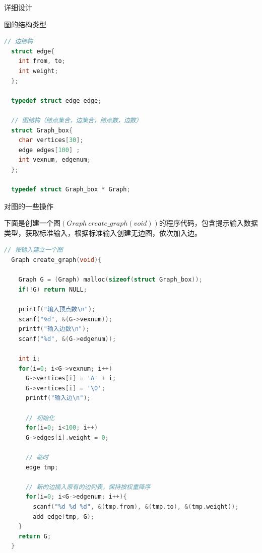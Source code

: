 \documentclass[UTF8]{ctexart}
\begin{document}
\begin{section}{详细设计}


\begin{subsection}{图的结构类型}


\begin{mdframed}[everyline=true]
\begin{lstlisting}[language=c]
  // 边结构
  struct edge{
    int from, to;
    int weight;
  };

  typedef struct edge edge;

  // 图结构（结点集合，边集合，结点数，边数）
  struct Graph_box{
    char vertices[30];
    edge edges[100] ;
    int vexnum, edgenum;
  };

  typedef struct Graph_box * Graph;

\end{lstlisting}
\end{mdframed}

\end{subsection}

\begin{subsection}{对图的一些操作}

\par{下面是创建一个图$(Graph\ create\_graph(void))$的程序代码，包含提示输入数据类型，获取标准输入，根据标准输入创建无边图，依次加入边。}

\begin{mdframed}[everyline=true]
\begin{lstlisting}[language=c]
  // 按输入建立一个图
  Graph create_graph(void){

    Graph G = (Graph) malloc(sizeof(struct Graph_box));
    if(!G) return NULL;

    printf("输入顶点数\n");
    scanf("%d", &(G->vexnum));
    printf("输入边数\n");
    scanf("%d", &(G->edgenum));

    int i;
    for(i=0; i<G->vexnum; i++)
      G->vertices[i] = 'A' + i;
      G->vertices[i] = '\0';
      printf("输入边\n");

      // 初始化
      for(i=0; i<100; i++)
      G->edges[i].weight = 0;

      // 临时
      edge tmp;

      // 新的边插入原有的边列表，保持按权重降序
      for(i=0; i<G->edgenum; i++){
        scanf("%d %d %d", &(tmp.from), &(tmp.to), &(tmp.weight));
        add_edge(tmp, G);
    }
    return G;
  }
\end{lstlisting}
\end{mdframed}


\end{subsection}
\end{section}
\end{document}
